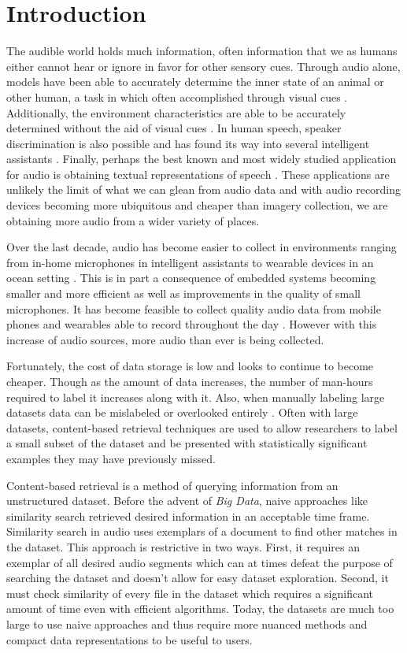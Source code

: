 \section{Introduction}

The audible world holds much information, often information that we as humans either cannot hear or ignore in favor for other sensory cues. Through audio alone, models have been able to accurately determine the inner state of an animal or other human, a task in which often accomplished through visual cues \cite{Farago2010, schuller_acoustic_2009}. Additionally, the environment characteristics are able to be accurately determined without the aid of visual cues \cite{Eronen2006}. In human speech, speaker discrimination is also possible and has found its way into several intelligent assistants \cite{Campbell1997}. Finally, perhaps the best known and most widely studied application for audio is obtaining textual representations of speech \cite{Rabiner1989}. These applications are unlikely the limit of what we can glean from audio data and with audio recording devices becoming more ubiquitous and cheaper than imagery collection, we are obtaining more audio from a wider variety of places.

Over the last decade, audio has become easier to collect in environments ranging from in-home microphones in intelligent assistants to wearable devices in an ocean setting \cite{kohlsdorf_underwater_2013}. This is in part a consequence of embedded systems becoming smaller and more efficient as well as improvements in the quality of small microphones. It has become feasible to collect quality audio data from mobile phones and wearables able to record throughout the day \cite{Lane2015, Choudhury2008}. However with this increase of audio sources, more audio than ever is being collected.

Fortunately, the cost of data storage is low and looks to continue to become cheaper. Though as the amount of data increases, the number of man-hours required to label it increases along with it. Also, when manually labeling large datasets data can be mislabeled or overlooked entirely \cite{Bardeli2009, Rong2018}. Often with large datasets, content-based retrieval techniques are used to allow researchers to label a small subset of the dataset and be presented with statistically significant examples they may have previously missed.

Content-based retrieval is a method of querying information from an unstructured dataset. Before the advent of \textit{Big Data}, naive approaches like similarity search retrieved desired information in an acceptable time frame. Similarity search in audio uses exemplars of a document to find other matches in the dataset. This approach is restrictive in two ways. First, it requires an exemplar of all desired audio segments which can at times defeat the purpose of searching the dataset and doesn't allow for easy dataset exploration. Second, it must check similarity of every file in the dataset which requires a significant amount of time even with efficient algorithms. Today, the datasets are much too large to use naive approaches and thus require more nuanced methods and compact data representations to be useful to users.

